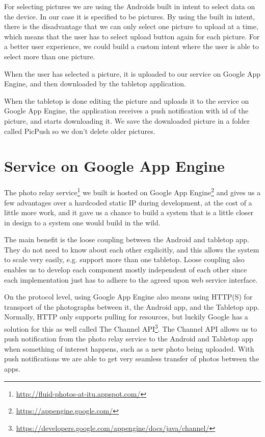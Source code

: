 \documentclass{article}
\begin{document}
For selecting pictures we are using the Androids built in intent to select data on the device. In our case it is specified to be pictures. By using the built in intent, there is the disadvantage that we can only select one picture to upload at a time, which means that the user has to select upload button again for each picture. For a better user experience, we could build a custom intent where the user is able to select more than one picture.
 
When the user has selected a picture, it is uploaded to our service on Google App Engine, and then downloaded by the tabletop application.
 
When the tabletop is done editing the picture and uploads it to the service on Google App Engine, the application receives a push notification with id of the picture, and starts downloading it.
We save the downloaded picture in a folder called PicPush so we don't delete older pictures.
 
\section{Service on Google App Engine}\label{service}
 
The photo relay service\footnote{\url{http://fluid-photos-at-itu.appspot.com/}} we built is hosted on Google App Engine\footnote{\url{https://appengine.google.com/}} and gives us a few advantages over a hardcoded static IP during development, at the cost of a little more work, and it gave us a chance to build a system that is a little closer in design to a system one would build in the wild.
 
The main benefit is the loose coupling between the Android and tabletop app. They do not need to know about each other explicitly, and this allows the system to scale very easily, e.g. support more than one tabletop. Loose coupling also enables us to develop each component mostly independent of each other since each implementation just has to adhere to the agreed upon web service interface.
 
On the protocol level, using Google App Engine also means using HTTP(S) for transport of the photographs between it, the Android app, and the Tabletop app. Normally, HTTP only supports pulling for resources, but luckily Google has a solution for this as well called The Channel API\footnote{\url{https://developers.google.com/appengine/docs/java/channel/}}. The Channel API allows us to push notification from the photo relay service to the Android and Tabletop app when something of interest happens, such as a new photo being uploaded. With push notifications we are able to get very seamless transfer of photos between the apps.
 
\end{document}
